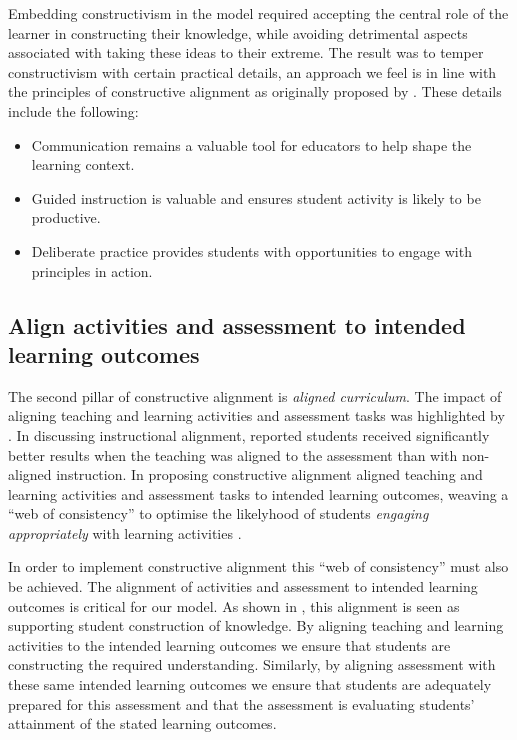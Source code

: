 Embedding constructivism in the model required accepting the central role of the learner in constructing their knowledge, while avoiding detrimental aspects associated with taking these ideas to their extreme. The result was to temper constructivism with certain practical details, an approach we feel is in line with the principles of constructive alignment as originally proposed by \citet{Biggs:1996c}. These details include the following:

\begin{itemize}[noitemsep,nolistsep]
	\item Communication remains a valuable tool for educators to help shape the learning context.
	\item Guided instruction is valuable and ensures student activity is likely to be productive.
	\item Deliberate practice provides students with opportunities to engage with principles in action.
\end{itemize}


\subsection{Align activities and assessment to intended learning outcomes} %
\label{ssub:align_activities_and_assessment_to_intended_learning_outcomes_}

The second pillar of constructive alignment is \emph{aligned curriculum}. The impact of aligning teaching and learning activities and assessment tasks was highlighted by \citet{Cohen:1987}. In discussing instructional alignment, \citet{Cohen:1987} reported students received significantly better results when the teaching was aligned to the assessment than with non-aligned instruction. In proposing constructive alignment \citet{Biggs:1996c} aligned teaching and learning activities and assessment tasks to intended learning outcomes, weaving a ``web of consistency'' to optimise the likelyhood of students \emph{engaging appropriately} with learning activities \cite{Biggs:1999}. 

In order to implement constructive alignment this ``web of consistency'' must also be achieved. The alignment of activities and assessment to intended learning outcomes is critical for our model. As shown in , this alignment is seen as supporting student construction of knowledge. By aligning teaching and learning activities to the intended learning outcomes we ensure that students are constructing the required understanding. Similarly, by aligning assessment with these same intended learning outcomes we ensure that students are adequately prepared for this assessment and that the assessment is evaluating students' attainment of the stated learning outcomes. 

